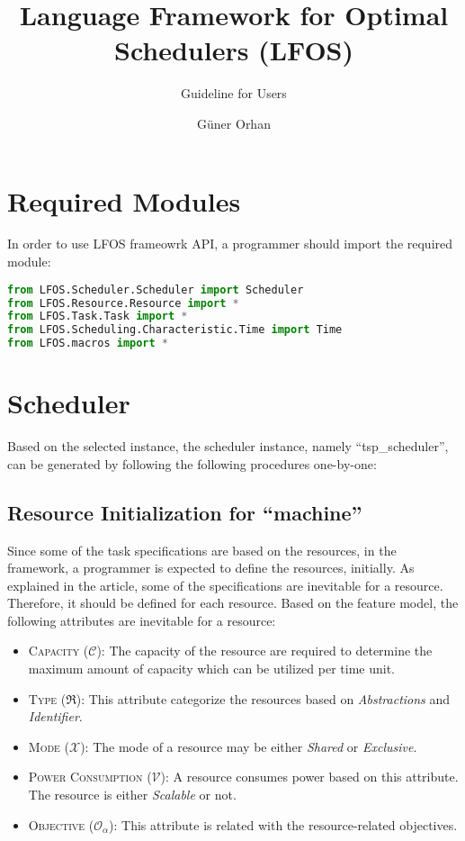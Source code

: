 \documentclass[]{scrartcl}
\title{Language Framework for Optimal Schedulers (LFOS)}
\subtitle{Guideline for Users}
\author{G\"{u}ner Orhan}
\begin{document}
\maketitle
    
\section{Required Modules}
In order to use LFOS frameowrk API, a programmer should import the required module:

\begin{lstlisting}[language=Python, frame=single, label={lst:moduleImport}, caption={Importing required modules}]
from LFOS.Scheduler.Scheduler import Scheduler
from LFOS.Resource.Resource import *
from LFOS.Task.Task import *
from LFOS.Scheduling.Characteristic.Time import Time
from LFOS.macros import *
\end{lstlisting}
        

\section{Scheduler}
Based on the selected instance, the scheduler instance, namely ``\textsf{tsp\_scheduler}'', can be generated by following the following procedures one-by-one:
        
\subsection{Resource Initialization for ``\textsf{machine}''}
        
Since some of the task specifications are based on the resources, in the framework, a programmer is expected to define the resources, initially.
As explained in the article, some of the specifications are inevitable for a resource. Therefore, it should be defined for each resource.
Based on the feature model, the following attributes are inevitable for a resource:
\begin{itemize}
    \item \textsc{Capacity} ($\mathcal{C}$): The capacity of the resource are required to determine the maximum amount of capacity which can be utilized
    per time unit.
    \item \textsc{Type} ($\Re$): This attribute categorize the resources based on \emph{Abstractions} and \emph{Identifier}.
    \item \textsc{Mode} ($\mathcal{X}$): The mode of a resource may be either \emph{Shared} or \emph{Exclusive}.
    \item \textsc{Power Consumption} ($\mathcal{V}$): A resource consumes power based on this attribute. The resource is either \emph{Scalable} or not.
    \item \textsc{Objective} ($\mathcal{O}_\alpha$): This attribute is related with the resource-related objectives.
\end{itemize}
\end{document}
